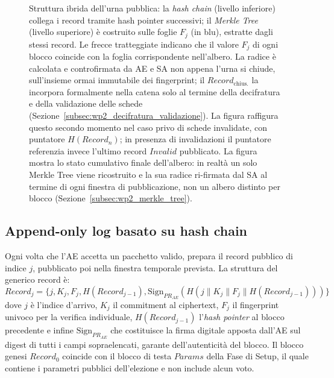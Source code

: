 \begin{figure}[H]
{%
}
\caption{Struttura ibrida dell'urna pubblica: la \textit{hash chain} (livello inferiore) collega
  i record tramite hash pointer successivi; il \textit{Merkle Tree} (livello superiore) è costruito
  sulle foglie $F_j$ (in blu), estratte dagli stessi record. Le frecce tratteggiate
  indicano che il valore $F_j$ di ogni blocco coincide con la foglia corrispondente
  nell'albero. La radice è calcolata e controfirmata da AE e SA non appena l'urna si chiude,
  sull'insieme ormai immutabile dei fingerprint; il $Record_{\text{chius.}}$ la incorpora
  formalmente nella catena solo al termine della decifratura e della validazione delle schede
  (Sezione~\ref{subsec:wp2_decifratura_validazione}). La figura raffigura questo secondo momento
  nel caso privo di schede invalidate, con puntatore $H(Record_n)$; in presenza di invalidazioni
  il puntatore referenzia invece l'ultimo record $Invalid$ pubblicato. La figura mostra lo stato
  cumulativo finale dell'albero: in realtà un solo Merkle Tree viene ricostruito e la sua radice
  ri-firmata dal SA al termine di ogni finestra di pubblicazione, non un albero distinto per blocco
  (Sezione~\ref{subsec:wp2_merkle_tree}).}
\label{fig:urna_ibrida}
\end{figure}

\clearpage
\subsection{Append-only log basato su hash chain}
\label{subsec:wp2_hash_chain}

Ogni volta che l'AE accetta un pacchetto valido, prepara il record pubblico di indice $j$, pubblicato poi nella finestra temporale prevista. La struttura del generico record è:
$$Record_j = \{ j, K_j, F_j, H(Record_{j-1}), \text{Sign}_{PR_{AE}}(H(j \parallel K_j \parallel F_j \parallel H(Record_{j-1}))) \}$$
dove $j$ è l'indice d'arrivo, $K_j$ il commitment al ciphertext, $F_j$ il fingerprint univoco per la verifica individuale, $H(Record_{j-1})$ l'\textit{hash pointer} al blocco precedente e infine $\text{Sign}_{PR_{AE}}$ che costituisce la firma digitale apposta dall'AE sul digest di tutti i campi sopraelencati, garante dell'autenticità del blocco. Il blocco genesi $Record_0$ coincide con il blocco di testa $Params$ della Fase di Setup, il quale contiene i parametri pubblici dell'elezione e non include alcun voto.

